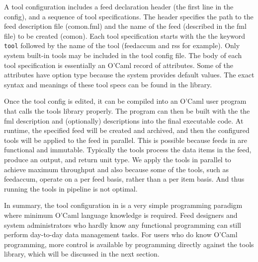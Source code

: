 A tool configuration includes a feed declaration header 
(the first line in the config),
and a sequence of tool specifications. The header specifies the path to the 
feed description file (comon.fml) and the name of the feed 
(described in the fml file) to be created (comon).
Each tool specification starts with the the keyword {\tt tool} followed by the
name of the tool (feedaccum and rss for example). Only system built-in tools may be 
included in the tool config file. The body of each tool specification is essentially
an O'Caml record of attributes. Some of the attributes have option type because
the system provides default values. The exact syntax and meanings of these tool specs 
can be found in the \padsd{} library. 

Once the tool config is edited, it can be compiled into an O'Caml user program
that calls the \padsd{} tools library properly. The program can then be built with the the
fml description and (optionally) \padsml{} descriptions into the final executable
code. At runtime, the specified feed will be created and archived, and then the
configured tools will be applied to the feed in parallel. This is possible because feeds in
\padsd{} are functional and immutable. Typically the tools process the data items
in the feed, produce an output, and return unit type. We apply the tools in parallel to
achieve maximum throughput and also because some of the tools, such as feedaccum,
operate on a per feed basis, rather than a per item basis. And thus running the tools
in pipeline is not optimal.

In summary, the tool configuration in \padsd{} is a very simple programming 
paradigm where minimum O'Caml language knowledge is required. Feed designers
and system administrators who hardly know any functional programming can still 
perform day-to-day data management tasks. For users who do know O'Caml programming, 
more control is available by programming directly against the \padsd{} 
tools library, which will be discussed in the next section.

